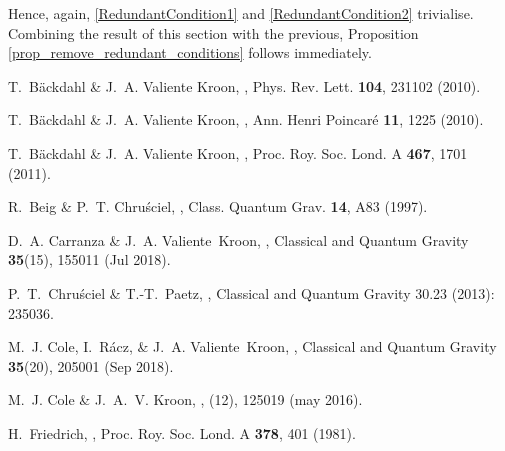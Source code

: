 \documentclass[10pt,a4paper]{article}
\theoremstyle{plain}
\begin{document}
Hence, again, \eqref{RedundantCondition1} and \eqref{RedundantCondition2} trivialise. Combining the result of this section with the previous, Proposition \ref{prop_remove_redundant_conditions} follows immediately.




\begin{thebibliography}{10}

T.~B\"{a}ckdahl \& J.~A. {Valiente Kroon},
,
\newblock Phys. Rev. Lett. {\bf 104}, 231102 (2010).

T.~B\"{a}ckdahl \& J.~A. {Valiente Kroon},
,
\newblock Ann. Henri Poincar\'e {\bf 11}, 1225 (2010).

T.~B\"{a}ckdahl \& J.~A. {Valiente Kroon},
,
\newblock Proc. Roy. Soc. Lond. A {\bf 467}, 1701 (2011).

R.~Beig \& P.~T. Chru\'{s}ciel,
,
\newblock Class. Quantum Grav. {\bf 14}, A83 (1997).

D.~A. Carranza \& J.~A. Valiente~Kroon,
,
\newblock Classical and Quantum Gravity {\bf 35}(15), 155011 (Jul 2018).

P.~T.~Chru\'{s}ciel \& T.-T.~Paetz, 
,
\newblock Classical and Quantum Gravity 30.23 (2013): 235036.

M.~J. Cole, I.~Rácz, \& J.~A. Valiente~Kroon,
,
\newblock Classical and Quantum Gravity {\bf 35}(20), 205001 (Sep 2018).

M.~J. Cole \& J.~A.~V. Kroon,
,
(12), 125019 (may 2016).

H.~Friedrich,
,
\newblock Proc. Roy. Soc. Lond. A {\bf 378}, 401 (1981).


\end{thebibliography}
\end{document}
